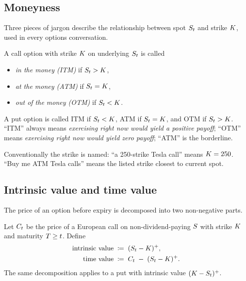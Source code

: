 \subsection{Moneyness}
\label{sec:ch14_moneyness}

Three pieces of jargon describe the relationship between spot
$S_t$ and strike $K$, used in every options conversation.

\begin{definition}[Moneyness]
\label{def:moneyness}
A call option with strike $K$ on underlying $S_t$ is
called
\begin{itemize}
  \item \emph{in the money (ITM)} if $S_t > K$,
  \item \emph{at the money (ATM)} if $S_t = K$,
  \item \emph{out of the money (OTM)} if $S_t < K$.
\end{itemize}
A put option is called ITM if $S_t < K$, ATM if
$S_t = K$, and OTM if $S_t > K$. ``ITM''
always means \emph{exercising right now would yield a positive
payoff}; ``OTM'' means \emph{exercising right now would yield
zero payoff}; ``ATM'' is the borderline.
\end{definition}

Conventionally the strike is named: ``a 250-strike Tesla call''
means $K = 250$. ``Buy me ATM Tesla calls'' means the
listed strike closest to current spot.

\subsection{Intrinsic value and time value}
\label{sec:ch14_intrinsic_time}

The price of an option before expiry is decomposed into two
non-negative parts.

\begin{definition}
\label{def:intrinsic_time}
Let $C_t$ be the price of a European call on
non-dividend-paying $S$ with strike $K$ and maturity
$T \geq t$. Define
\begin{align}
  \text{intrinsic value} &\;\coloneqq\; (S_t - K)^+,
  \label{eq:intrinsic_call} \\
  \text{time value}      &\;\coloneqq\; C_t \;-\; (S_t - K)^+.
  \label{eq:time_value_call}
\end{align}
The same decomposition applies to a put with intrinsic value
$(K - S_t)^+$.
\end{definition}


